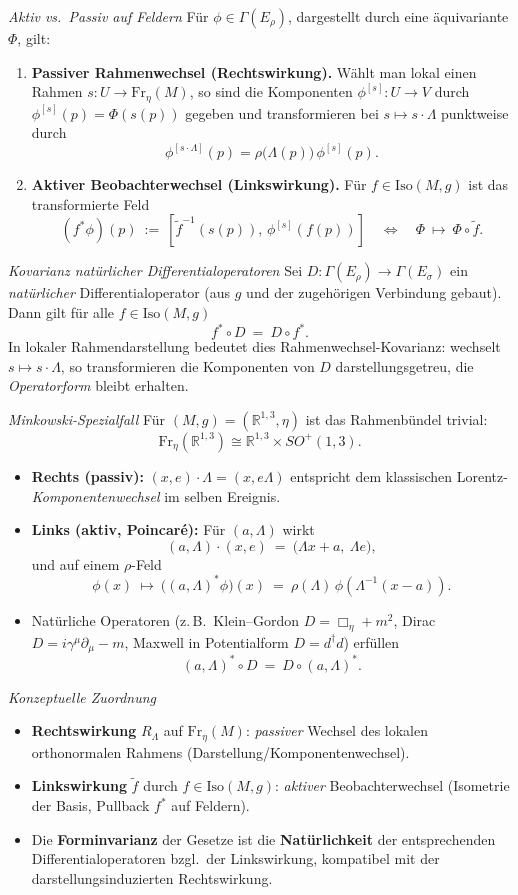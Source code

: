 \documentclass[10pt, letterpaper]{article}
\newcommand{\Iso}{\mathrm{Iso}}
\begin{document}
\emph{Aktiv vs.\ Passiv auf Feldern}
Für $\phi\in\Gamma(E_\rho)$, dargestellt durch eine äquivariante $\Phi$, gilt:
\begin{enumerate}
  \item \textbf{Passiver Rahmenwechsel (Rechtswirkung).} Wählt man lokal einen Rahmen $s:U\to\mathrm{Fr}_\eta(M)$, so sind die Komponenten $\phi^{[s]}:U\to V$ durch $\phi^{[s]}(p)=\Phi(s(p))$ gegeben und transformieren bei $s\mapsto s\cdot\Lambda$ punktweise durch
  \[
  \phi^{[s\cdot\Lambda]}(p)=\rho\big(\Lambda(p)\big)\,\phi^{[s]}(p).
  \]
  \item \textbf{Aktiver Beobachterwechsel (Linkswirkung).} Für $f\in\Iso(M,g)$ ist das transformierte Feld
  \[
  (f^*\phi)(p)\ :=\ [\tilde f^{-1}(s(p)),\,\phi^{[s]}(f(p))]
  \quad\Longleftrightarrow\quad
  \Phi\ \mapsto\ \Phi\circ\tilde f.
  \]
\end{enumerate}


\emph{Kovarianz natürlicher Differentialoperatoren}
Sei $D:\Gamma(E_\rho)\to\Gamma(E_\sigma)$ ein \emph{natürlicher} Differentialoperator (aus $g$ und der zugehörigen Verbindung gebaut). Dann gilt für alle $f\in\Iso(M,g)$
\[
f^*\circ D\ =\ D\circ f^*.
\]
In lokaler Rahmendarstellung bedeutet dies Rahmenwechsel-Kovarianz: wechselt $s\mapsto s\cdot\Lambda$, so transformieren die Komponenten von $D$ darstellungsgetreu, die \emph{Operatorform} bleibt erhalten.


\emph{Minkowski-Spezialfall}
Für $(M,g)=(\mathbb{R}^{1,3},\eta)$ ist das Rahmenbündel trivial:
\[
\mathrm{Fr}_\eta(\mathbb{R}^{1,3})\cong \mathbb{R}^{1,3}\times SO^+(1,3).
\]
\begin{itemize}
  \item \textbf{Rechts (passiv):} $(x,e)\cdot\Lambda=(x,e\Lambda)$ entspricht dem klassischen Lorentz-\emph{Komponentenwechsel} im selben Ereignis.
  \item \textbf{Links (aktiv, Poincaré):} Für $(a,\Lambda)$ wirkt
  \[
  (a,\Lambda)\cdot(x,e)\ =\ \big(\Lambda x+a,\ \Lambda e\big),
  \]
  und auf einem $\rho$-Feld
  \[
  \phi(x)\ \longmapsto\ \big((a,\Lambda)^*\phi\big)(x)\ =\ \rho(\Lambda)\,\phi(\Lambda^{-1}(x-a)).
  \]
  \item Natürliche Operatoren (z.\,B.\ Klein–Gordon $D=\Box_\eta+m^2$, Dirac $D=i\gamma^\mu\partial_\mu-m$, Maxwell in Potentialform $D=d^\dagger d$) erfüllen
  \[
  (a,\Lambda)^*\circ D\ =\ D\circ (a,\Lambda)^*.
  \]
\end{itemize}


\emph{Konzeptuelle Zuordnung}
\begin{itemize}
  \item \textbf{Rechtswirkung} $R_\Lambda$ auf $\mathrm{Fr}_\eta(M)$: \emph{passiver} Wechsel des lokalen orthonormalen Rahmens (Darstellung/Komponentenwechsel).
  \item \textbf{Linkswirkung} $\tilde f$ durch $f\in\Iso(M,g)$: \emph{aktiver} Beobachterwechsel (Isometrie der Basis, Pullback $f^*$ auf Feldern).
  \item Die \textbf{Forminvarianz} der Gesetze ist die \textbf{Natürlichkeit} der entsprechenden Differentialoperatoren bzgl.\ der Linkswirkung, kompatibel mit der darstellungsinduzierten Rechtswirkung.
\end{itemize}
\end{document}
